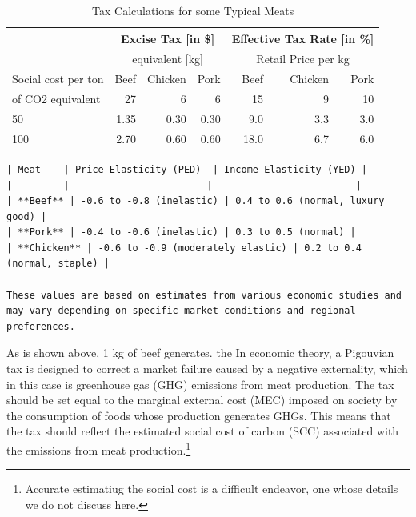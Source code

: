 \documentclass{article}[12pt,letterpaper]
\begin{document}
\begin{table}[ht]
    \begin{center}
    \caption{Tax Calculations for some Typical Meats}	
	\begin{tabular}{l|rrr|rrr}
	\hline
	& \multicolumn{3}{c|}{Excise Tax [in \$]} & \multicolumn{3}{c}{Effective Tax Rate [in \%]}                        \\
	\hline
	& \multicolumn{3}{c|}{\cadi equivalent [kg]} & \multicolumn{3}{c}{Retail Price per kg}            \\
	\hline	
	Social cost per ton & Beef & Chicken & Pork & Beef &    Chicken &       Pork \\
	of CO2 equivalent &                  27 &          6 &          6 &                                               15 &          9 &         10 \\
	\hline
					50 &                1.35 &        0.30 &        0.30 &                                             9.0 &   3.3 &       3.0 \\
					100 &               2.70 &        0.60 &        0.60 &                                            18.0 &   6.7 &       6.0 \\
	\hline
	\end{tabular}
\end{center}
\end{table}
	

\begin{verbatim}
| Meat    | Price Elasticity (PED)  | Income Elasticity (YED) |
|---------|------------------------|-------------------------|
| **Beef** | -0.6 to -0.8 (inelastic) | 0.4 to 0.6 (normal, luxury good) |
| **Pork** | -0.4 to -0.6 (inelastic) | 0.3 to 0.5 (normal) |
| **Chicken** | -0.6 to -0.9 (moderately elastic) | 0.2 to 0.4 (normal, staple) |

These values are based on estimates from various economic studies and may vary depending on specific market conditions and regional preferences.
\end{verbatim}



As is shown above, 1 kg of beef generates. the In economic theory, a Pigouvian tax is designed to correct a market failure caused by a negative externality, which in this case is greenhouse gas (GHG) emissions from meat production. The tax should be set equal to the marginal external cost (MEC) imposed on society by the consumption of foods whose production generates GHGs. This means that the tax should reflect the estimated social cost of carbon (SCC) associated with the emissions from meat production.\footnote{Accurate estimatiug the social cost is a difficult endeavor, one whose details we do not discuss here.}
\end{document}
